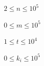 \documentclass[11.5pt,a4paper,oneside]{article}
\begin{document}
\begin{problem}
\constraints
\begin{shortitems}
\item $2 \le n \le 10^5$
\item $0 \le m \le 10^5$
\item $1 \le t \le 10^4$
\item $0 \le k_{i} \le 10^5$
\end{shortitems}

\sampleIO

\begin{example}
%
\end{example}

\begin{example}
%
\end{example}

\end{problem}
\end{document}
